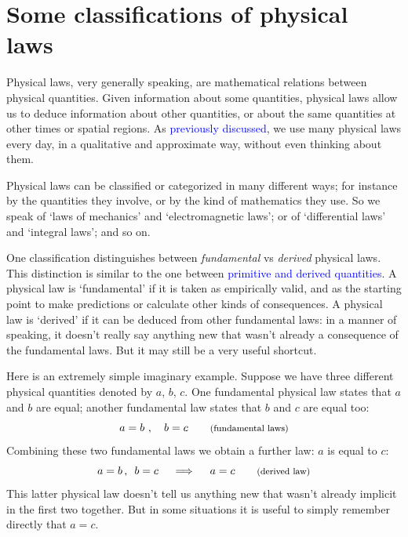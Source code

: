 \documentclass[a4paper,12pt,%
onecolumn,oneside,%
british%
]{memoir}
\renewcommand*{\|}[1][]{\nonscript\:#1\vert\nonscript\:\mathopen{}}
\newcommand*{\sect}{\S}%
\renewcommand*{\autoref}[2]{\sidepar{\vspace{-1ex}\footnotesize{\color{blue}\faIcon{%
angle-right%
}\enskip\sect~\ref{#1} page~\pageref{#1}}}\textcolor{blue}{#2}}
\begin{document}
\section{Some classifications of physical laws}
\label{sec:fundamental_derived}

Physical laws, very generally speaking, are mathematical relations between physical quantities. Given information about some quantities, physical laws allow us to deduce information about other quantities, or about the same quantities at other times or spatial regions. As \autoref{sec:phys_laws0}{previously discussed}, we use many physical laws every day, in a qualitative and approximate way, without even thinking about them.

Physical laws can be classified or categorized in many different ways; for instance by the quantities they involve, or by the kind of mathematics they use. So we speak of \enquote*{laws of mechanics} and \enquote*{electromagnetic laws}; or of \enquote*{differential laws} and \enquote*{integral laws}; and so on.

\medskip

One classification distinguishes between \emph{fundamental} vs \emph{derived} physical laws. This distinction is similar to the one between \autoref{sec:primitives}{primitive and derived quantities}. A physical law is \enquote*{fundamental} if it is taken as empirically valid, and as the starting point to make predictions or calculate other kinds of consequences. A physical law is \enquote*{derived} if it can be deduced from other fundamental laws: in a manner of speaking, it doesn't really say anything new that wasn't already a consequence of the fundamental laws. But it may still be a very useful shortcut.

Here is an extremely simple imaginary example. Suppose we have three different physical quantities denoted by $a$, $b$, $c$. One fundamental physical law states that $a$ and $b$ are equal; another fundamental law states that $b$ and $c$ are equal too:
\begin{equation*}
  a=b \ , \quad b=c \qquad\text{\footnotesize(fundamental laws)}
\end{equation*}
Combining these two fundamental laws we obtain a further law: $a$ is equal to $c$:
\begin{equation*}
  a=b\,,\enskip b=c \quad\implies\quad a=c\qquad\text{\footnotesize(derived law)}
\end{equation*}
This latter physical law doesn't tell us anything new that wasn't already implicit in the first two together. But in some situations it is useful to simply remember directly that $a=c$.
\end{document}
